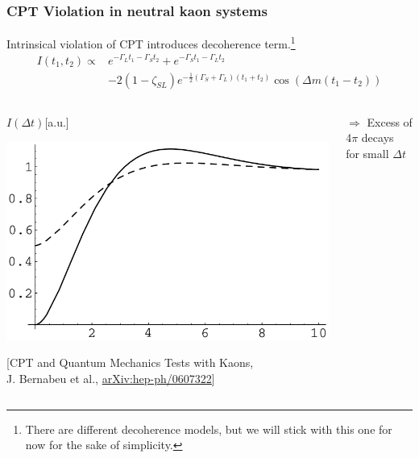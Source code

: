 \documentclass{beamer}
\begin{document}
\begin{frame}[fragile]
\frametitle{CPT Violation in neutral kaon systems}
\vspace*{-.2cm}
Intrinsical violation of CPT introduces decoherence term.\footnote{There are different decoherence models, but we will stick with this one for now for the sake of simplicity.}
\vspace*{-.2cm}
\large{
\begin{align*}
I(t_1,t_2) \propto & e^{-\Gamma_L t_1 - \Gamma_S t_2} +e^{-\Gamma_S t_1 - \Gamma_L t_2}\\& - 2(1-\zeta_{SL}) e^{-\frac{1}{2}\left(\Gamma_S + \Gamma_L\right)\left(t_1+t_2\right)}\cos\left(\Delta m \left(t_1-t_2\right)\right)
\end{align*}}
\normalsize
\vspace*{-.3cm}
\begin{columns}
\begin{column}{.49\columnwidth}
\tiny{$I(\Delta t)$[a.u.]}\vspace*{-.3cm}
\begin{center}
\includegraphics[width = .9\columnwidth]{Excess.png}
\end{center}

\vspace{.1cm}
\tiny{[CPT and Quantum Mechanics Tests with Kaons,\\ J. Bernabeu et al., \href{http://arxiv.org/abs/hep-ph/0607322}{arXiv:hep-ph/0607322}]}
\end{column}

\normalsize

\begin{column}{.49\columnwidth}
\centering
$\Rightarrow$ Excess of 4$\pi$ decays \\for small $\Delta t$
\end{column}

\end{columns}

\end{frame}
\end{document}
